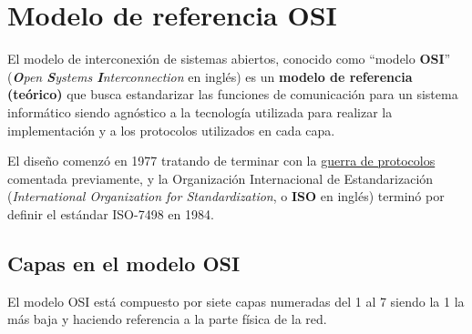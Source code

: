 \section{Modelo de referencia OSI}
El modelo de interconexión de sistemas abiertos, conocido como “modelo \textbf{OSI}” (\textit{\textbf{O}pen \textbf{S}ystems \textbf{I}nterconnection} en inglés) es un \textbf{modelo de referencia (teórico)} que busca estandarizar las funciones de comunicación para un sistema informático siendo agnóstico a la tecnología utilizada para realizar la implementación y a los protocolos utilizados en cada capa.

El diseño comenzó en 1977 tratando de terminar con la \href{https://en.wikipedia.org/wiki/Protocol_Wars}{guerra de protocolos} comentada previamente, y la Organización Internacional de Estandarización (\textit{International Organization for Standardization}, o \textbf{ISO} en inglés)  terminó por definir el estándar ISO-7498 en 1984.


\subsection{Capas en el modelo OSI}
El modelo OSI está compuesto por siete capas numeradas del 1 al 7 siendo la 1 la más baja y haciendo referencia a la parte física de la red.


